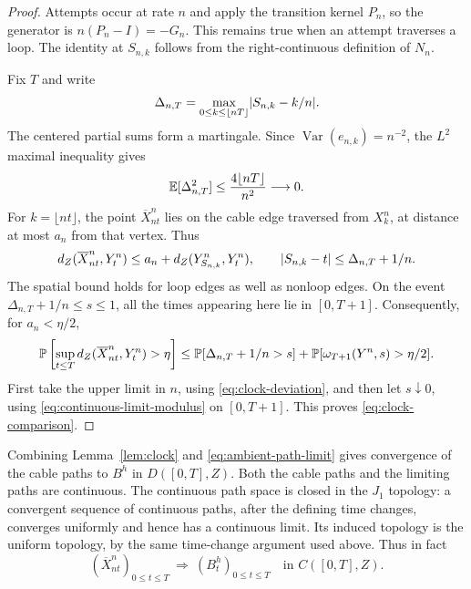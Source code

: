 \begin{proof}
Attempts occur at rate $n$ and apply the transition kernel $P_n$,
so the generator is $n(P_n-I)=-G_n$.  This remains true when an
attempt traverses a loop.  The identity at $S_{n,k}$ follows from the
right-continuous definition of $N_n$.

Fix $T$ and write
\[
 \Delta_{n,T}=
 \max_{0\le k\le\lfloor nT\rfloor}\lvert S_{n,k}-k/n\rvert.
\]
The centered partial sums form a martingale.  Since
$\operatorname{Var}(e_{n,k})=n^{-2}$, the $L^2$ maximal inequality gives
\begin{equation}\label{eq:clock-deviation}
 \mathbb E[\Delta_{n,T}^2]
 \le \frac{4\lfloor nT\rfloor}{n^2}\longrightarrow0.
\end{equation}
For $k=\lfloor nt\rfloor$, the point $\overline X^n_{nt}$ lies on the
cable edge traversed from $X^n_k$, at distance at most $a_n$ from that
vertex.  Thus
\[
 d_Z(\overline X^n_{nt},Y^n_t)
 \le a_n+d_Z(Y^n_{S_{n,k}},Y^n_t),
 \qquad
 \lvert S_{n,k}-t\rvert\le\Delta_{n,T}+1/n.
\]
The spatial bound holds for loop edges as well as nonloop edges.
On the event $\Delta_{n,T}+1/n\le s\le1$, all the times appearing here
lie in $[0,T+1]$.  Consequently, for $a_n<\eta/2$,
\[
 \mathbb P\left[\sup_{t\le T}
 d_Z(\overline X^n_{nt},Y^n_t)>\eta\right]
 \le \mathbb P[\Delta_{n,T}+1/n>s]
   +\mathbb P[\omega_{T+1}(Y^n,s)>\eta/2].
\]
First take the upper limit in $n$, using
\eqref{eq:clock-deviation}, and then let $s\downarrow0$, using
\eqref{eq:continuous-limit-modulus} on $[0,T+1]$.  This proves
\eqref{eq:clock-comparison}.
\end{proof}

Combining Lemma~\ref{lem:clock} and \eqref{eq:ambient-path-limit} gives
convergence of the cable paths to $B^h$ in $D([0,T],Z)$.  Both the cable
paths and the limiting paths are continuous.  The continuous path space
is closed in the $J_1$ topology: a convergent sequence of continuous
paths, after the defining time changes, converges uniformly and hence
has a continuous limit.  Its induced topology is the uniform topology,
by the same time-change argument used above.  Thus in fact
\begin{equation}\label{eq:cable-finite-horizon}
 (\overline X^n_{nt})_{0\le t\le T}
 \ \Longrightarrow\ (B^h_t)_{0\le t\le T}
 \quad\text{in }C([0,T],Z).
\end{equation}

